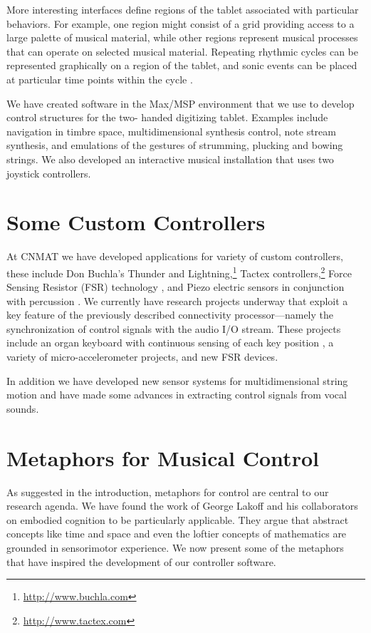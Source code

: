 More interesting interfaces define regions of the tablet associated with particular behaviors. For example, one region might consist of a grid providing access to a large palette of musical material, while other regions represent musical processes that can operate on selected musical material. Repeating rhythmic cycles can be represented graphically on a region of the tablet, and sonic events can be placed at particular time points within the cycle \cite{Wright:1998}.

We have created software in the Max/MSP environment that we use to develop control structures for the two- handed digitizing tablet. Examples include navigation in timbre space, multidimensional synthesis control, note stream synthesis, and emulations of the gestures of strumming, plucking and bowing strings. We also developed an interactive musical installation that uses two joystick controllers.

\section{Some Custom Controllers}

At CNMAT we have developed applications for variety of custom controllers, these include Don Buchla's Thunder and Lightning,\footnote{\url{http://www.buchla.com}} Tactex controllers,\footnote{\url{http://www.tactex.com}} Force Sensing Resistor (FSR) technology \cite{Rovan:1997}, and Piezo electric sensors in conjunction with percussion \cite{Campion:1999}. We currently have research projects underway that exploit a key feature of the previously described connectivity processor---namely the synchronization of control signals with the audio I/O stream. These projects include an organ keyboard with continuous sensing of each key position \cite{Freed:2000}, a variety of micro-accelerometer projects, and new FSR devices.

In addition we have developed new sensor systems for multidimensional string motion \cite{Freed:2000a} and have made some advances in extracting control signals from vocal sounds.

\section{Metaphors for Musical Control}

As suggested in the introduction, metaphors for control are central to our research agenda. We have found the work of George Lakoff and his collaborators \cite{Lakoff:1999,Lakoff:2000} on embodied cognition to be particularly applicable. They argue that abstract concepts like time and space and even the loftier concepts of mathematics are grounded in sensorimotor experience. We now present some of the metaphors that have inspired the development of our controller software.

